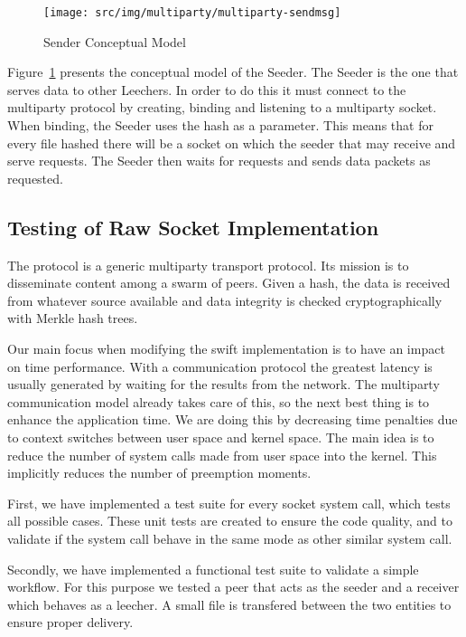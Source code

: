 \begin{figure}
  \centering
  \texttt{[image: src/img/multiparty/multiparty-sendmsg]}
  \caption{Sender Conceptual Model}
  \label{fig:multiparty:multiparty-sendmsg}
\end{figure}

Figure~\ref{fig:multiparty:multiparty-sendmsg} presents the conceptual model
of the Seeder. The Seeder is the one that serves data to other Leechers. In
order to do this it must connect to the multiparty protocol by creating,
binding and listening to a multiparty socket. When binding, the Seeder
uses the hash as a parameter. This means that for every file hashed there will
be a socket on which the seeder that may receive and serve requests. The Seeder
then waits for requests and sends data packets as requested.

\subsection{Testing of Raw Socket Implementation}

The  protocol is a generic multiparty transport protocol. Its mission is to
disseminate content among a swarm of peers.  Given a hash, the data is
received from whatever source available and data integrity is checked
cryptographically with Merkle hash trees. 

Our main focus when modifying the swift implementation is to have an impact on
time performance. With a communication protocol the greatest latency is
usually generated by waiting for the results from the network. The multiparty
communication model already takes care of this, so the next best thing is to
enhance the application time. We are doing this by decreasing time
penalties due to context switches between user space and kernel space. The
main idea is to reduce the number of system calls made from user space into
the kernel. This implicitly reduces the number of preemption moments.

First, we have implemented a test suite for every socket system call, which
tests all possible cases. These unit tests are created to ensure the code
quality, and to validate if the system call behave in the same mode as other
similar system call.

Secondly, we have implemented a functional test suite to validate a simple
workflow. For this purpose we tested a peer that acts as the seeder and a
receiver which behaves as a leecher. A small file is transfered between the
two entities to ensure proper delivery.

